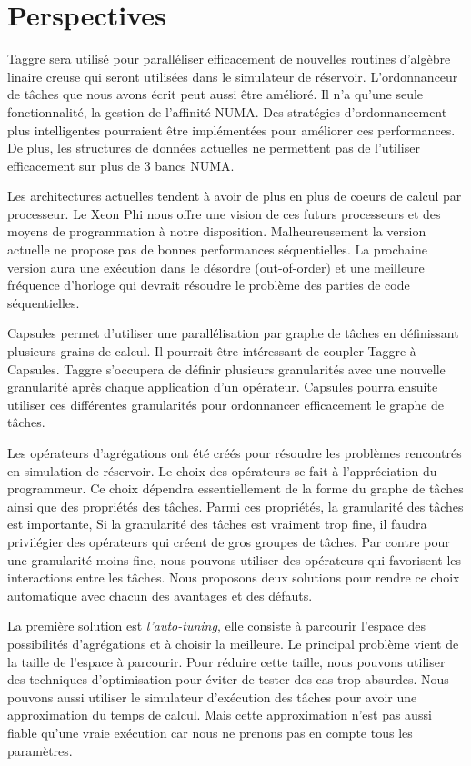 \section{Perspectives}
Taggre sera utilisé pour paralléliser efficacement de nouvelles routines d'algèbre linaire creuse qui seront utilisées dans le simulateur de réservoir.
%
L'ordonnanceur de tâches que nous avons écrit peut aussi être amélioré.
%
Il n'a qu'une seule fonctionnalité, la gestion de l'affinité NUMA.
%
Des stratégies d'ordonnancement plus intelligentes pourraient être implémentées pour améliorer ces performances.
%
De plus, les structures de données actuelles ne permettent pas de l'utiliser efficacement sur plus de 3 bancs NUMA.


Les architectures actuelles tendent à avoir de plus en plus de coeurs de calcul par processeur.
%
Le Xeon Phi nous offre une vision de ces futurs processeurs et des moyens de programmation à notre disposition.
%
Malheureusement la version actuelle ne propose pas de bonnes performances séquentielles.
%
La prochaine version aura une exécution dans le désordre (out-of-order) et une meilleure fréquence d'horloge qui devrait résoudre le problème des parties de code séquentielles.


Capsules permet d'utiliser une parallélisation par graphe de tâches en définissant plusieurs grains de calcul.
%
Il pourrait être intéressant de coupler Taggre à Capsules.
%
Taggre s'occupera de définir plusieurs granularités avec une nouvelle granularité après chaque application d'un opérateur.
%
Capsules pourra ensuite utiliser ces différentes granularités pour ordonnancer efficacement le graphe de tâches.


Les opérateurs d'agrégations ont été créés pour résoudre les problèmes rencontrés en simulation de réservoir.
%
Le choix des opérateurs se fait à l'appréciation du programmeur.
%
Ce choix dépendra essentiellement de la forme du graphe de tâches ainsi que des propriétés des tâches.
%
Parmi ces propriétés, la granularité des tâches est importante,
%
Si la granularité des tâches est vraiment trop fine, il faudra privilégier des opérateurs qui créent de gros groupes de tâches.
%
Par contre pour une granularité moins fine, nous pouvons utiliser des opérateurs qui favorisent les interactions entre les tâches.
%
Nous proposons deux solutions pour rendre ce choix automatique avec chacun des avantages et des défauts.


La première solution est {\em l'auto-tuning}, elle consiste à parcourir l'espace des possibilités d'agrégations et à choisir la meilleure.
%
Le principal problème vient de la taille de l'espace à parcourir.
%
Pour réduire cette taille, nous pouvons utiliser des techniques d'optimisation pour éviter de tester des cas trop absurdes.
%
Nous pouvons aussi utiliser le simulateur d'exécution des tâches pour avoir une approximation du temps de calcul.
%
Mais cette approximation n'est pas aussi fiable qu'une vraie exécution car nous ne prenons pas en compte tous les paramètres.


